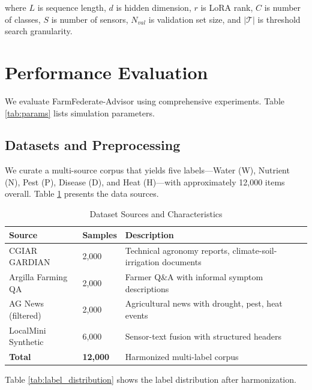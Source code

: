 \documentclass[10pt,journal,compsoc]{IEEEtran}
\begin{document}
where $L$ is sequence length, $d$ is hidden dimension, $r$ is LoRA rank, $C$ is number of classes, $S$ is number of sensors, $N_{val}$ is validation set size, and $|\mathcal{T}|$ is threshold search granularity.

\section{Performance Evaluation}
\label{sec:experiments}

We evaluate FarmFederate-Advisor using comprehensive experiments. Table \ref{tab:params} lists simulation parameters.

\subsection{Datasets and Preprocessing}

We curate a multi-source corpus that yields five labels---Water (W), Nutrient (N), Pest (P), Disease (D), and Heat (H)---with approximately 12,000 items overall. Table \ref{tab:datasets} presents the data sources.

\begin{table}[!t]
\centering
\caption{Dataset Sources and Characteristics}
\label{tab:datasets}
\small
\begin{tabular}{p{2cm}p{1cm}p{4cm}}
\toprule
\textbf{Source} & \textbf{Samples} & \textbf{Description} \\
\midrule
CGIAR GARDIAN & 2,000 & Technical agronomy reports, climate-soil-irrigation documents \\
Argilla Farming QA & 2,000 & Farmer Q\&A with informal symptom descriptions \\
AG News (filtered) & 2,000 & Agricultural news with drought, pest, heat events \\
LocalMini Synthetic & 6,000 & Sensor-text fusion with structured headers \\
\midrule
\textbf{Total} & \textbf{12,000} & Harmonized multi-label corpus \\
\bottomrule
\end{tabular}
\end{table}

Table \ref{tab:label_distribution} shows the label distribution after harmonization.
\end{document}
